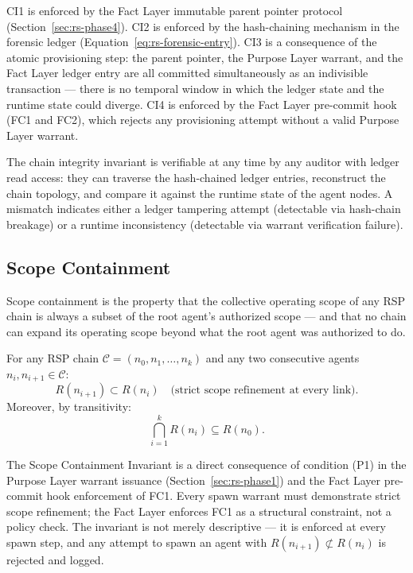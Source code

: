 CI1 is enforced by the Fact Layer immutable parent pointer protocol (Section~\ref{sec:rs-phase4}). CI2 is enforced by the hash-chaining mechanism in the forensic ledger (Equation~\ref{eq:rs-forensic-entry}). CI3 is a consequence of the atomic provisioning step: the parent pointer, the Purpose Layer warrant, and the Fact Layer ledger entry are all committed simultaneously as an indivisible transaction — there is no temporal window in which the ledger state and the runtime state could diverge. CI4 is enforced by the Fact Layer pre-commit hook (FC1 and FC2), which rejects any provisioning attempt without a valid Purpose Layer warrant.

The chain integrity invariant is verifiable at any time by any auditor with ledger read access: they can traverse the hash-chained ledger entries, reconstruct the chain topology, and compare it against the runtime state of the agent nodes. A mismatch indicates either a ledger tampering attempt (detectable via hash-chain breakage) or a runtime inconsistency (detectable via warrant verification failure).

\subsection{Scope Containment}
\label{sec:rs-scope-containment}

Scope containment is the property that the collective operating scope of any RSP chain is always a subset of the root agent's authorized scope — and that no chain can expand its operating scope beyond what the root agent was authorized to do.

\begin{property}
\label{inv:scope-containment}
For any RSP chain $\mathcal{C} = (n_0, n_1, \ldots, n_k)$ and any two consecutive agents $n_i, n_{i+1} \in \mathcal{C}$:
\begin{equation}
R(n_{i+1}) \subset R(n_i) \quad \text{(strict scope refinement at every link)}.
\end{equation}
Moreover, by transitivity:
\begin{equation}
\bigcap_{i=1}^{k} R(n_i) \subseteq R(n_0).
\end{equation}
\end{property}

The Scope Containment Invariant is a direct consequence of condition (P1) in the Purpose Layer warrant issuance (Section~\ref{sec:rs-phase1}) and the Fact Layer pre-commit hook enforcement of FC1. Every spawn warrant must demonstrate strict scope refinement; the Fact Layer enforces FC1 as a structural constraint, not a policy check. The invariant is not merely descriptive — it is enforced at every spawn step, and any attempt to spawn an agent with $R(n_{i+1}) \not\subset R(n_i)$ is rejected and logged.

